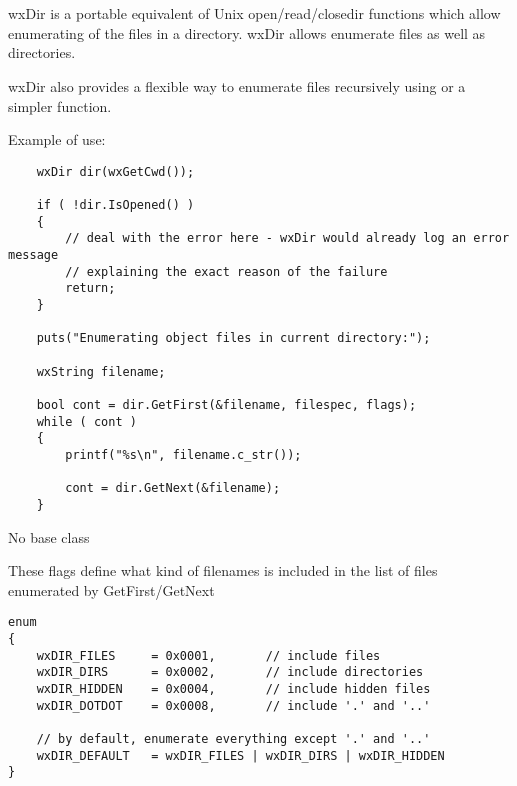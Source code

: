 
\section{}\label{wxdir}

wxDir is a portable equivalent of Unix {open/read/close}dir functions which
allow enumerating of the files in a directory. wxDir allows enumerate files as
well as directories.

wxDir also provides a flexible way to enumerate files recursively using 
 or a simpler 
 function.

Example of use:

\begin{verbatim}
    wxDir dir(wxGetCwd());

    if ( !dir.IsOpened() )
    {
        // deal with the error here - wxDir would already log an error message
        // explaining the exact reason of the failure
        return;
    }

    puts("Enumerating object files in current directory:");

    wxString filename;

    bool cont = dir.GetFirst(&filename, filespec, flags);
    while ( cont )
    {
        printf("%s\n", filename.c_str());

        cont = dir.GetNext(&filename);
    }
\end{verbatim}


No base class


These flags define what kind of filenames is included in the list of files
enumerated by GetFirst/GetNext

{\small
\begin{verbatim}
enum
{
    wxDIR_FILES     = 0x0001,       // include files
    wxDIR_DIRS      = 0x0002,       // include directories
    wxDIR_HIDDEN    = 0x0004,       // include hidden files
    wxDIR_DOTDOT    = 0x0008,       // include '.' and '..'

    // by default, enumerate everything except '.' and '..'
    wxDIR_DEFAULT   = wxDIR_FILES | wxDIR_DIRS | wxDIR_HIDDEN
}
\end{verbatim}
}

